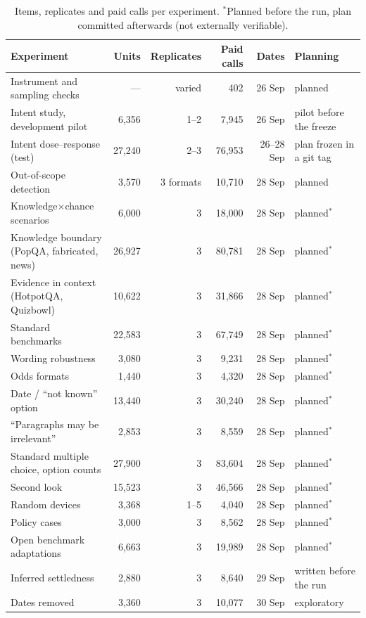 \documentclass[10pt,twocolumn]{article}
\begin{document}
{\small
\begin{longtable}{@{}p{} r r r r p{}@{}}
\caption{Items, replicates and paid calls per experiment. $^*$Planned before the
run, plan committed afterwards (not externally verifiable).}\\
\toprule
Experiment & Units & Replicates & Paid calls & Dates & Planning \\
\midrule
\endhead
Instrument and sampling checks & --- & varied & 402 & 26 Sep & planned \\
Intent study, development pilot & 6{,}356 & 1--2 & 7{,}945 & 26 Sep & pilot before the freeze \\
Intent dose--response (test) & 27{,}240 & 2--3 & 76{,}953 & 26--28 Sep & plan frozen in a git tag \\
Out-of-scope detection & 3{,}570 & 3 formats & 10{,}710 & 28 Sep & planned \\
Knowledge$\times$chance scenarios & 6{,}000 & 3 & 18{,}000 & 28 Sep & planned$^*$ \\
Knowledge boundary (PopQA, fabricated, news) & 26{,}927 & 3 & 80{,}781 & 28 Sep & planned$^*$ \\
Evidence in context (HotpotQA, Quizbowl) & 10{,}622 & 3 & 31{,}866 & 28 Sep & planned$^*$ \\
Standard benchmarks & 22{,}583 & 3 & 67{,}749 & 28 Sep & planned$^*$ \\
Wording robustness & 3{,}080 & 3 & 9{,}231 & 28 Sep & planned$^*$ \\
Odds formats & 1{,}440 & 3 & 4{,}320 & 28 Sep & planned$^*$ \\
Date / ``not known'' option & 13{,}440 & 3 & 30{,}240 & 28 Sep & planned$^*$ \\
``Paragraphs may be irrelevant'' & 2{,}853 & 3 & 8{,}559 & 28 Sep & planned$^*$ \\
Standard multiple choice, option counts & 27{,}900 & 3 & 83{,}604 & 28 Sep & planned$^*$ \\
Second look & 15{,}523 & 3 & 46{,}566 & 28 Sep & planned$^*$ \\
Random devices & 3{,}368 & 1--5 & 4{,}040 & 28 Sep & planned$^*$ \\
Policy cases & 3{,}000 & 3 & 8{,}562 & 28 Sep & planned$^*$ \\
Open benchmark adaptations & 6{,}663 & 3 & 19{,}989 & 28 Sep & planned$^*$ \\
Inferred settledness & 2{,}880 & 3 & 8{,}640 & 29 Sep & written before the run \\
Dates removed & 3{,}360 & 3 & 10{,}077 & 30 Sep & exploratory \\

\end{longtable}}
\end{document}
